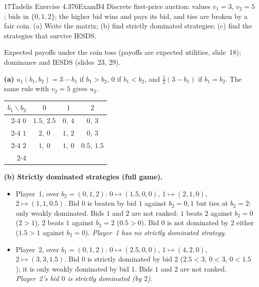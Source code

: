 \begin{exsol}{17}{Tadelis Exercise 4.3}{76}{Exam}{B4}
\asked Discrete first-price auction: values $v_1 = 3$, $v_2 = 5$; bids in $\{0, 1, 2\}$; the
higher bid wins and pays its bid, and ties are broken by a fair coin. (a) Write the matrix;
(b) find strictly dominated strategies; (c) find the strategies that survive IESDS.

\method Expected payoffs under the coin toss (payoffs are expected utilities, slide~18);
dominance and IESDS (slides~23, 29).

\solution
\textbf{(a)} $u_1(b_1, b_2) = 3 - b_1$ if $b_1 > b_2$, $0$ if $b_1 < b_2$, and
$\tfrac12(3 - b_1)$ if $b_1 = b_2$. The same rule with $v_2 = 5$ gives $u_2$.
\begin{center}
\begin{tabular}{r|c|c|c|}
\multicolumn{1}{r}{$b_1 \backslash b_2$} & \multicolumn{1}{c}{$0$} & \multicolumn{1}{c}{$1$} & \multicolumn{1}{c}{$2$}\\ \cline{2-4}
$0$ & $1.5,\ 2.5$ & $0,\ 4$ & $0,\ 3$ \\ \cline{2-4}
$1$ & $2,\ 0$ & $1,\ 2$ & $0,\ 3$ \\ \cline{2-4}
$2$ & $1,\ 0$ & $1,\ 0$ & $0.5,\ 1.5$ \\ \cline{2-4}
\end{tabular}
\end{center}

\textbf{(b) Strictly dominated strategies (full game).}
\begin{itemize}
  \item Player~1, over $b_2 = (0,1,2)$: $0 \mapsto (1.5, 0, 0)$, $1 \mapsto (2, 1, 0)$,
  $2 \mapsto (1, 1, 0.5)$. Bid $0$ is beaten by bid $1$ against $b_2 = 0, 1$ but ties at $b_2 = 2$:
  only weakly dominated. Bids $1$ and $2$ are not ranked: $1$ beats $2$ against $b_2 = 0$
  ($2 > 1$), $2$ beats $1$ against $b_2 = 2$ ($0.5 > 0$). Bid $0$ is not dominated by $2$ either
  ($1.5 > 1$ against $b_2 = 0$). \emph{Player~1 has no strictly dominated strategy.}
  \item Player~2, over $b_1 = (0,1,2)$: $0 \mapsto (2.5, 0, 0)$, $1 \mapsto (4, 2, 0)$,
  $2 \mapsto (3, 3, 1.5)$. Bid $0$ is strictly dominated by bid $2$ ($2.5 < 3$, $0 < 3$,
  $0 < 1.5$); it is only weakly dominated by bid $1$. Bids $1$ and $2$ are not ranked.
  \emph{Player~2's bid $0$ is strictly dominated (by $2$).}
\end{itemize}


\end{exsol}
